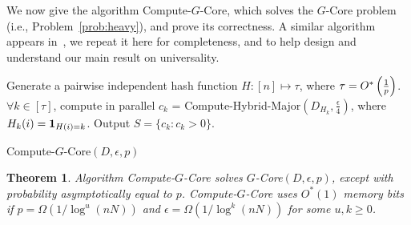 \documentclass[11pt]{article}
\newtheorem{thm}{Theorem}
\newcommand{\one}{{\bf 1}}
\begin{document}
We now give the algorithm Compute-$G$-Core, which solves the $G$-Core problem
(i.e., Problem~\ref{prob:heavy}), and prove its correctness.
A similar algorithm appears in~\cite{BO10}, we
repeat it here for completeness, and to help design and understand our main result on universality.

\begin{algorithm}\label{alg:heavy}
\DontPrintSemicolon
Generate a pairwise independent hash function $H: [n] \mapsto \tau$, where $\tau = O^*\left({1\over p}\right)$. \;
$\forall k\in [\tau]$, compute in parallel $c_k$ = Compute-Hybrid-Major$(D_{H_k}, \frac{\epsilon}{4})$,
where $H_k(i) = \one_{H(i) = k}$. \;
Output $S = \{c_k : c_k > 0\}$. \;
\caption{Compute-$G$-Core$(D, \epsilon, p)$}
\end{algorithm}

\begin{thm}\label{thm:gcore}
Algorithm Compute-$G$-Core solves $G$-Core$(D, \epsilon, p)$, except with probability asymptotically equal to $p$.
Compute-$G$-Core uses $O^*(1)$ memory bits if $p = \Omega(1/\log^{u}(nN))$ and $\epsilon = \Omega(1/\log^{k}(nN))$
for some $u,k \geq 0$.
\end{thm}
\end{document}
